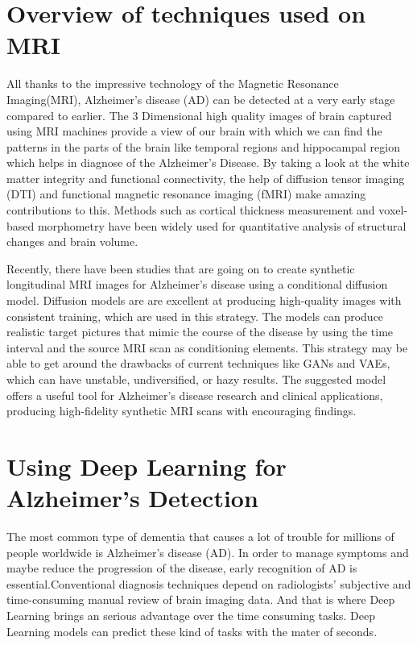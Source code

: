 \documentclass[12pt,twocolumn]{report}
\begin{document}
\section{Overview of techniques used on MRI}
All thanks to the impressive technology of the Magnetic Resonance Imaging(MRI), Alzheimer's disease (AD) can be detected at a very early stage compared to earlier. The 3 Dimensional high quality images of brain captured using MRI machines provide a view of our brain with which we can find the patterns in the parts of the brain like temporal regions and hippocampal region which helps in diagnose of the Alzheimer’s Disease. By taking a look at the white matter integrity and functional connectivity, the help of diffusion tensor imaging (DTI) and functional magnetic resonance imaging (fMRI) make amazing contributions to this. Methods such as cortical thickness measurement and voxel-based morphometry have been widely used for quantitative analysis of structural changes and brain volume\cite{zou2023}.

Recently, there have been studies that are going on to create synthetic longitudinal MRI images for Alzheimer's disease using a conditional diffusion model. Diffusion models are are excellent at producing high-quality images with consistent training, which are used in this strategy. The models can produce realistic target pictures that mimic the course of the disease by using the time interval and the source MRI scan as conditioning elements. This strategy may be able to get around the drawbacks of current techniques like GANs and VAEs, which can have unstable, undiversified, or hazy results. The suggested model offers a useful tool for Alzheimer's disease research and clinical applications, producing high-fidelity synthetic MRI scans with encouraging findings\cite{Duy2024}.


\section{Using Deep Learning for Alzheimer’s Detection}
The most common type of dementia that causes a lot of trouble for  millions of people worldwide is Alzheimer's disease (AD). In order to manage symptoms and maybe reduce the progression of the disease, early recognition of AD is essential\cite{2023ShenLiu}.Conventional diagnosis techniques depend on radiologists' subjective and time-consuming manual review of brain imaging data. And that is where Deep Learning brings an serious advantage over the time consuming tasks. Deep Learning models can predict these kind of tasks with the mater of seconds.
\end{document}
